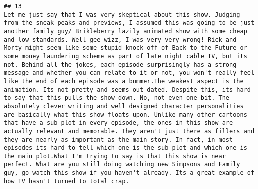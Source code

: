 \documentclass[
]{article}
\begin{document}
\begin{verbatim}
## 13                                                                                                                                                                                                                                                                                                                                                                                                                                                                                                                                                                                                                                                                                                                                                                                                                                                                                                                                                                                                   Let me just say that I was very skeptical about this show. Judging from the sneak peaks and previews, I assumed this was going to be just another family guy/ Brikleberry lazily animated show with some cheap and low standards. Well gee wizz, I was very very wrong! Rick and Morty might seem like some stupid knock off of Back to the Future or some money laundering scheme as part of late night cable TV, but its not. Behind all the jokes, each episode surprisingly has a strong message and whether you can relate to it or not, you won't really feel like the end of each episode was a bummer.The weakest aspect is the animation. Its not pretty and seems out dated. Despite this, its hard to say that this pulls the show down. No, not even one bit. The absolutely clever writing and well designed character personalities are basically what this show floats upon. Unlike many other cartoons that have a sub plot in every episode, the ones in this show are actually relevant and memorable. They aren't just there as fillers and they are nearly as important as the main story. In fact, in most episodes its hard to tell which one is the sub plot and which one is the main plot.What I'm trying to say is that this show is near perfect. What are you still doing watching new Simpsons and Family guy, go watch this show if you haven't already. Its a great example of how TV hasn't turned to total crap.

\end{verbatim}
\end{document}
